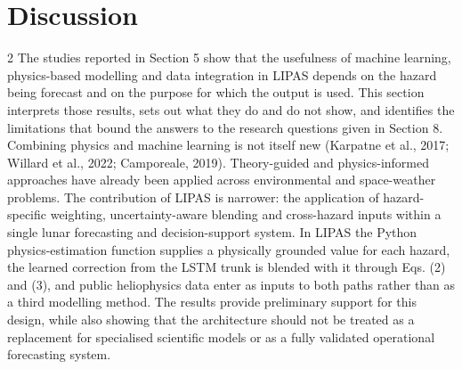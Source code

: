 \section{Discussion}
\begin{multicols}{2}
The studies reported in Section 5 show that the usefulness of machine learning, physics-based modelling and data integration in LIPAS depends on the hazard being forecast and on the purpose for which the output is used. This section interprets those results, sets out what they do and do not show, and identifies the limitations that bound the answers to the research questions given in Section 8. Combining physics and machine learning is not itself new (Karpatne et al., 2017; Willard et al., 2022; Camporeale, 2019). Theory-guided and physics-informed approaches have already been applied across environmental and space-weather problems. The contribution of LIPAS is narrower: the application of hazard-specific weighting, uncertainty-aware blending and cross-hazard inputs within a single lunar forecasting and decision-support system. In LIPAS the Python physics-estimation function supplies a physically grounded value for each hazard, the learned correction from the LSTM trunk is blended with it through Eqs. (2) and (3), and public heliophysics data enter as inputs to both paths rather than as a third modelling method. The results provide preliminary support for this design, while also showing that the architecture should not be treated as a replacement for specialised scientific models or as a fully validated operational forecasting system.


\end{multicols}
